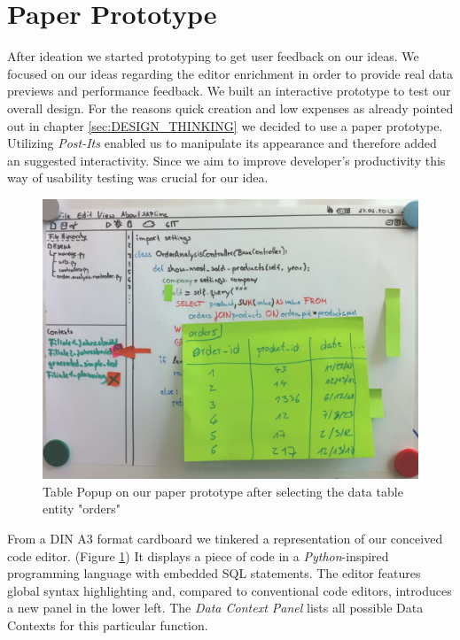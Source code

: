 
\section[Paper Prototype (Author: Thomas B\"unger]{Paper Prototype}
\label{sec:PAPER_PROTOTYPE}

After ideation we started prototyping to get user feedback on our ideas. 
We focused on our ideas regarding the editor enrichment in order to provide real data previews and performance feedback.
We built an interactive prototype to test our overall design. For the reasons quick creation and low expenses as already pointed out in chapter \ref{sec:DESIGN_THINKING} we decided to use a paper prototype. Utilizing \emph{Post-Its} enabled us to manipulate its appearance and therefore added an suggested interactivity.
Since we aim to improve developer's productivity this way of usability testing was crucial for our idea. \\


\begin{figure}
\begin{centering}
    \includegraphics[width=0.8\linewidth]{images/paper_prototype2}
    \caption{Table Popup on our paper prototype after selecting the data table entity "orders"}
    \label{fig:paper_prototype2}
\end{centering}
\end{figure}

From a DIN A3 format cardboard we tinkered a representation of our conceived code editor. (Figure \ref{fig:paper_prototype2})
It displays a piece of code in a \emph{Python}-inspired programming language with embedded SQL statements.
The editor features global syntax highlighting and, compared to conventional code editors, introduces a new panel in the lower left. The \emph{Data Context Panel} lists all possible Data Contexts for this particular function.\\

